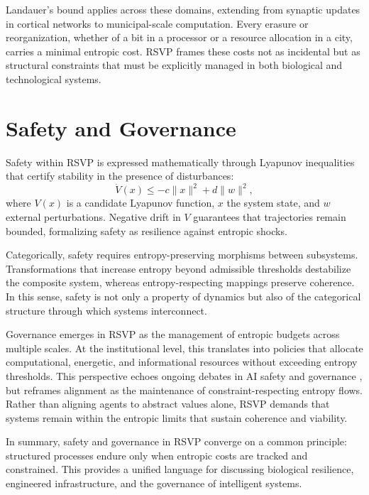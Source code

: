 \documentclass[12pt]{article}
\begin{document}
Landauer’s bound applies across these domains, extending from synaptic updates in cortical networks to municipal-scale computation. Every erasure or reorganization, whether of a bit in a processor or a resource allocation in a city, carries a minimal entropic cost. RSVP frames these costs not as incidental but as structural constraints that must be explicitly managed in both biological and technological systems.

\section{Safety and Governance}
\label{sec:safety}

Safety within RSVP is expressed mathematically through Lyapunov inequalities that certify stability in the presence of disturbances:
\begin{equation}
\dot V(x) \leq -c \|x\|^2 + d \|w\|^2 ,
\end{equation}
where $V(x)$ is a candidate Lyapunov function, $x$ the system state, and $w$ external perturbations. Negative drift in $V$ guarantees that trajectories remain bounded, formalizing safety as resilience against entropic shocks.  

Categorically, safety requires entropy-preserving morphisms between subsystems. Transformations that increase entropy beyond admissible thresholds destabilize the composite system, whereas entropy-respecting mappings preserve coherence. In this sense, safety is not only a property of dynamics but also of the categorical structure through which systems interconnect.  

Governance emerges in RSVP as the management of entropic budgets across multiple scales. At the institutional level, this translates into policies that allocate computational, energetic, and informational resources without exceeding entropy thresholds. This perspective echoes ongoing debates in AI safety and governance \cite{Bostrom2014,Russell2019,lehalleur2025}, but reframes alignment as the maintenance of constraint-respecting entropy flows. Rather than aligning agents to abstract values alone, RSVP demands that systems remain within the entropic limits that sustain coherence and viability.  

In summary, safety and governance in RSVP converge on a common principle: structured processes endure only when entropic costs are tracked and constrained. This provides a unified language for discussing biological resilience, engineered infrastructure, and the governance of intelligent systems.
\end{document}
